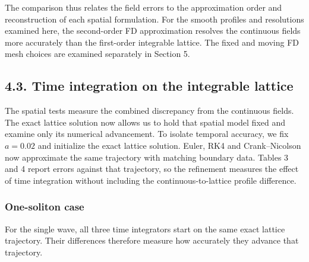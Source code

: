 \documentclass[11pt,a4paper]{article}
\begin{document}
The comparison thus relates the field errors to the approximation order and reconstruction of each spatial formulation. For the smooth profiles and resolutions examined here, the second-order FD approximation resolves the continuous fields more accurately than the first-order integrable lattice. The fixed and moving FD mesh choices are examined separately in Section 5.

\FloatBarrier
\subsection*{4.3. Time integration on the integrable lattice}

The spatial tests measure the combined discrepancy from the continuous fields. The exact lattice solution now allows us to hold that spatial model fixed and examine only its numerical advancement. To isolate temporal accuracy, we fix \(a=0.02\) and initialize the exact lattice solution. Euler, RK4 and Crank–Nicolson now approximate the same trajectory with matching boundary data. Tables 3 and 4 report errors against that trajectory, so the refinement measures the effect of time integration without including the continuous-to-lattice profile difference.

\subsubsection*{One-soliton case}

For the single wave, all three time integrators start on the same exact lattice trajectory. Their differences therefore measure how accurately they advance that trajectory.
\end{document}
